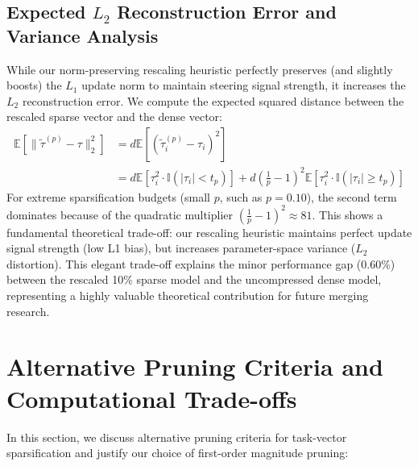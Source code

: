 \subsection{Expected $L_2$ Reconstruction Error and Variance Analysis}
While our norm-preserving rescaling heuristic perfectly preserves (and slightly boosts) the $L_1$ update norm to maintain steering signal strength, it increases the $L_2$ reconstruction error. We compute the expected squared distance between the rescaled sparse vector and the dense vector:
\begin{align}
\mathbb{E}[\|\tilde{\tau}^{(p)} - \tau\|_2^2] &= d \mathbb{E}\left[ (\tilde{\tau}_i^{(p)} - \tau_i)^2 \right] \nonumber \\
&= d \mathbb{E}\left[ \tau_i^2 \cdot \mathbb{I}(|\tau_i| < t_p) \right] + d \left( \frac{1}{p} - 1 \right)^2 \mathbb{E}\left[ \tau_i^2 \cdot \mathbb{I}(|\tau_i| \geq t_p) \right]
\end{align}
For extreme sparsification budgets (small $p$, such as $p = 0.10$), the second term dominates because of the quadratic multiplier $(\frac{1}{p} - 1)^2 \approx 81$. This shows a fundamental theoretical trade-off: our rescaling heuristic maintains perfect update signal strength (low L1 bias), but increases parameter-space variance ($L_2$ distortion). This elegant trade-off explains the minor performance gap (0.60\%) between the rescaled 10\% sparse model and the uncompressed dense model, representing a highly valuable theoretical contribution for future merging research.

\section{Alternative Pruning Criteria and Computational Trade-offs}
\label{sec:appendix_alternative_criteria}

In this section, we discuss alternative pruning criteria for task-vector sparsification and justify our choice of first-order magnitude pruning:

